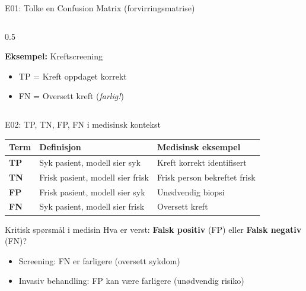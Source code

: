 \documentclass[aspectratio=169, 10pt]{beamer}
\begin{document}
\begin{frame}{E01: Tolke en Confusion Matrix (forvirringsmatrise)}
\begin{columns}
\begin{column}{0.5\textwidth}
            \vspace{3mm}
            
            \textbf{Eksempel:} Kreftscreening
            \begin{itemize}
                \item TP = Kreft oppdaget korrekt
                \item FN = Oversett kreft (\textit{farlig!})
            \end{itemize}
        \end{column}
    \end{columns}
    
\end{frame}

\begin{frame}{E02: TP, TN, FP, FN i medisinsk kontekst}
    
    \begin{table}
        \centering
        \begin{tabular}{@{}lp{5cm}p{5cm}@{}}
            \toprule
            \textbf{Term} & \textbf{Definisjon} & \textbf{Medisinsk eksempel} \\
            \midrule
            \textbf{TP} & Syk pasient, modell sier syk & Kreft korrekt identifisert \\
            \textbf{TN} & Frisk pasient, modell sier frisk & Frisk person bekreftet frisk \\
            \textbf{FP} & Frisk pasient, modell sier syk & Unødvendig biopsi \\
            \textbf{FN} & Syk pasient, modell sier frisk & \textcolor{uibred}{Oversett kreft} \\
            \bottomrule
        \end{tabular}
    \end{table}
    
    \vspace{5mm}
    
    \begin{alertblock}{Kritisk spørsmål i medisin}
        Hva er verst: \textbf{Falsk positiv} (FP) eller \textbf{Falsk negativ} (FN)?
        \begin{itemize}
            \item Screening: FN er farligere (oversett sykdom)
            \item Invasiv behandling: FP kan være farligere (unødvendig risiko)
        \end{itemize}
    \end{alertblock}
    
\end{frame}
\end{document}
